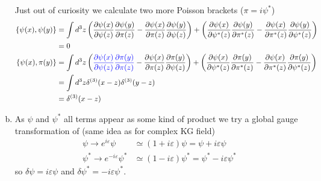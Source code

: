 \documentclass[10pt,a4paper]{report}
\theoremstyle{definition}
\begin{document}
\begin{enumerate}[a)]
Just out of curiosity we calculate two more Poisson brackets ($\pi=i\psi^*$)
\begin{align}
\{\psi(x),\psi(y)\}
&=\int d^3z\left(\frac{\partial\psi(x)}{\partial\psi(z)}\frac{\partial\psi(y)}{\partial\pi(z)}
-\frac{\partial\psi(x)}{\partial\pi(z)}\frac{\partial\psi(y)}{\partial\psi(z)}\right)+
\left(\frac{\partial\psi(x)}{\partial\psi^*(z)}\frac{\partial\psi(y)}{\partial\pi^*(z)}
-\frac{\partial\psi(x)}{\partial\pi^*(z)}\frac{\partial\psi(y)}{\partial\psi^*(z)}\right)\\
&=0\\
\{\psi(x),\pi(y)\}
&=\int d^3z\left(\textcolor{blue}{\frac{\partial\psi(x)}{\partial\psi(z)}\frac{\partial\pi(y)}{\partial\pi(z)}}
-\frac{\partial\psi(x)}{\partial\pi(z)}\frac{\partial\pi(y)}{\partial\psi(z)}\right)+
\left(\frac{\partial\psi(x)}{\partial\psi^*(z)}\frac{\partial\pi(y)}{\partial\pi^*(z)}
-\frac{\partial\psi(x)}{\partial\pi^*(z)}\frac{\partial\pi(y)}{\partial\psi^*(z)}\right)\\
&=\int d^3z\delta^{(3)}(x-z)\delta^{(3)}(y-z)\\
&=\delta^{(3)}(x-z)
\end{align}

\item As $\psi$ and $\psi^*$ all terms appear as some kind of product we try a global gauge transformation of (same idea as for complex KG field)
\begin{align}
\psi\rightarrow e^{i\varepsilon}\psi&\simeq(1+i\varepsilon)\psi=\psi+i\varepsilon\psi\\
\psi^*\rightarrow e^{-i\varepsilon}\psi^*&\simeq(1-i\varepsilon)\psi^*=\psi^*-i\varepsilon\psi^*
\end{align}
so $\delta\psi=i\varepsilon\psi$ and $\delta\psi^*=-i\varepsilon\psi^*$.


\end{enumerate}
\end{document}
